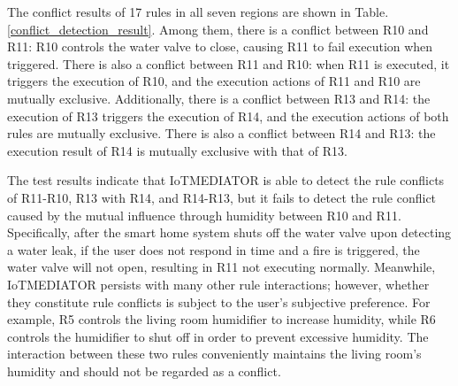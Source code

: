 The conflict results of 17 rules in all seven regions are shown in Table.\ref{conflict_detection_result}. Among them, there is a conflict between R10 and R11: R10 controls the water valve to close, causing R11 to fail execution when triggered. There is also a conflict between R11 and R10: when R11 is executed, it triggers the execution of R10, and the execution actions of R11 and R10 are mutually exclusive. Additionally, there is a conflict between R13 and R14: the execution of R13 triggers the execution of R14, and the execution actions of both rules are mutually exclusive. There is also a conflict between R14 and R13: the execution result of R14 is mutually exclusive with that of R13.

The test results indicate that IoTMEDIATOR is able to detect the rule conflicts of R11-R10, R13 with R14, and R14-R13, but it fails to detect the rule conflict caused by the mutual influence through humidity between R10 and R11. Specifically, after the smart home system shuts off the water valve upon detecting a water leak, if the user does not respond in time and a fire is triggered, the water valve will not open, resulting in R11 not executing normally. Meanwhile, IoTMEDIATOR persists with many other rule interactions; however, whether they constitute rule conflicts is subject to the user's subjective preference. For example, R5 controls the living room humidifier to increase humidity, while R6 controls the humidifier to shut off in order to prevent excessive humidity. The interaction between these two rules conveniently maintains the living room’s humidity and should not be regarded as a conflict.

